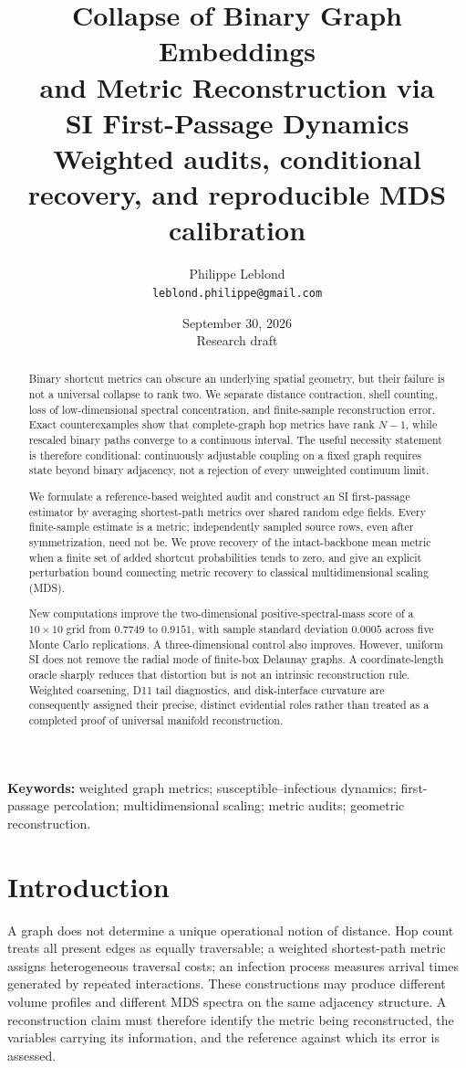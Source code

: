 \documentclass[11pt,letterpaper]{article}
\title{\LARGE\bfseries Collapse of Binary Graph Embeddings\\and Metric Reconstruction via\\SI First-Passage Dynamics\\[.6em]\large\mdseries Weighted audits, conditional recovery, and reproducible MDS calibration}
\author{Philippe Leblond\\\small\texttt{leblond.philippe@gmail.com}}
\date{September 30, 2026\\\small Research draft}
\theoremstyle{definition}
\theoremstyle{remark}
\begin{document}
\maketitle
\begin{abstract}
Binary shortcut metrics can obscure an underlying spatial geometry, but their failure is not a universal collapse to rank two. We separate distance contraction, shell counting, loss of low-dimensional spectral concentration, and finite-sample reconstruction error. Exact counterexamples show that complete-graph hop metrics have rank $N-1$, while rescaled binary paths converge to a continuous interval. The useful necessity statement is therefore conditional: continuously adjustable coupling on a fixed graph requires state beyond binary adjacency, not a rejection of every unweighted continuum limit.

We formulate a reference-based weighted audit and construct an SI first-passage estimator by averaging shortest-path metrics over shared random edge fields. Every finite-sample estimate is a metric; independently sampled source rows, even after symmetrization, need not be. We prove recovery of the intact-backbone mean metric when a finite set of added shortcut probabilities tends to zero, and give an explicit perturbation bound connecting metric recovery to classical multidimensional scaling (MDS).

New computations improve the two-dimensional positive-spectral-mass score of a $10\times10$ grid from $0.7749$ to $0.9151$, with sample standard deviation $0.0005$ across five Monte Carlo replications. A three-dimensional control also improves. However, uniform SI does not remove the radial mode of finite-box Delaunay graphs. A coordinate-length oracle sharply reduces that distortion but is not an intrinsic reconstruction rule. Weighted coarsening, D11 tail diagnostics, and disk-interface curvature are consequently assigned their precise, distinct evidential roles rather than treated as a completed proof of universal manifold reconstruction.
\end{abstract}
\noindent\textbf{Keywords:} weighted graph metrics; susceptible--infectious dynamics; first-passage percolation; multidimensional scaling; metric audits; geometric reconstruction.

\section{Introduction}
A graph does not determine a unique operational notion of distance. Hop count treats all present edges as equally traversable; a weighted shortest-path metric assigns heterogeneous traversal costs; an infection process measures arrival times generated by repeated interactions. These constructions may produce different volume profiles and different MDS spectra on the same adjacency structure. A reconstruction claim must therefore identify the metric being reconstructed, the variables carrying its information, and the reference against which its error is assessed.
\end{document}
